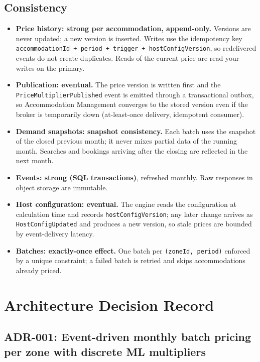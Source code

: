 \documentclass[11pt,a4paper]{article}
\begin{document}
\subsection{Consistency}
\begin{itemize}
  \item \textbf{Price history: strong per accommodation, append-only.}
    Versions are never updated; a new version is inserted. Writes use the
    idempotency key \texttt{accommodationId + period + trigger + hostConfigVersion}, so
    redelivered events do not create duplicates. Reads of the current price
    are read-your-writes on the primary.
  \item \textbf{Publication: eventual.} The price version is written first
    and the \texttt{PriceMultiplierPublished} event is emitted through a
    transactional outbox, so Accommodation Management converges to the stored
    version even if the broker is temporarily down (at-least-once delivery,
    idempotent consumer).
  \item \textbf{Demand snapshots: snapshot consistency.} Each batch uses the
    snapshot of the closed previous month; it never mixes partial data of the
    running month. Searches and bookings arriving after the closing are
    reflected in the next month.
  \item \textbf{Events: strong (SQL transactions)}, refreshed monthly. Raw
    responses in object storage are immutable.
  \item \textbf{Host configuration: eventual.} The engine reads the
    configuration at calculation time and records \texttt{hostConfigVersion};
    any later change arrives as \texttt{HostConfigUpdated} and produces a new
    version, so stale prices are bounded by event-delivery latency.
  \item \textbf{Batches: exactly-once effect.} One batch per
    \texttt{(zoneId, period)} enforced by a unique constraint; a failed batch
    is retried and skips accommodations already priced.
\end{itemize}

\section{Architecture Decision Record}

\subsection*{ADR-001: Event-driven monthly batch pricing per zone with discrete ML multipliers}
\end{document}
